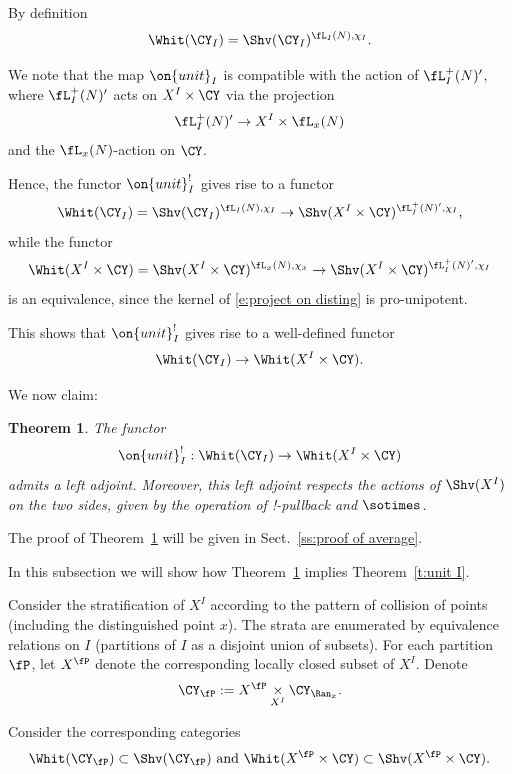 \documentclass[9pt]{amsart}
\newtheorem{thm}[subsubsection]{Theorem}
\theoremstyle{definition}
\theoremstyle{remark}
\newcommand{\thmref}[1]{Theorem~\ref{#1}}
\newcommand{\secref}[1]{Sect.~\ref{#1}}
\numberwithin{equation}{section}
\begin{document}
By definition
$$\Whit(\CY_I)=\Shv(\CY_I)^{\fL_I(N),\chi_I}.$$

We note that the map $\on{unit}_I$ is compatible with the action of $\fL^+_I(N)'$, where $\fL^+_I(N)'$ acts on $X^I\times \CY$
via the projection 
\begin{equation} \label{e:project on disting}
\fL^+_I(N)'\to X^I\times \fL_x(N)
\end{equation} 
and the $\fL_x(N)$-action on $\CY$.

\medskip

Hence, the functor $\on{unit}_I^!$ gives rise to a functor
$$\Whit(\CY_I)=\Shv(\CY_I)^{\fL_I(N),\chi_I}\to \Shv(X^I\times \CY)^{\fL^+_I(N)',\chi_I},$$
while the functor
$$\Whit(X^I\times \CY)=\Shv(X^I\times \CY)^{\fL_x(N),\chi_x}\to \Shv(X^I\times \CY)^{\fL^+_I(N)',\chi_I}$$
is an equivalence, since the kernel of \eqref{e:project on disting} is pro-unipotent. 

\medskip

This shows that $\on{unit}_I^!$ gives rise to a well-defined functor
$$\Whit(\CY_I)\to \Whit(X^I\times \CY).$$

\sssec{}

We now claim:

\begin{thm} \label{t:averaging}
The functor 
$$\on{unit}_I^!:\Whit(\CY_I)\to \Whit(X^I\times \CY)$$
admits a left adjoint.  
Moreover, this left adjoint respects the actions of $\Shv(X^I)$ on the two sides, given by
the operation of !-pullback and $\sotimes$. 
\end{thm}

The proof of \thmref{t:averaging} will be given in \secref{ss:proof of average}. 

\ssec{Proof of \thmref{t:unit I}}  

In this subsection we will show how \thmref{t:averaging} implies \thmref{t:unit I}. 

\sssec{}

Consider the stratification of $X^I$ according to the pattern of collision of points (including the distinguished point $x$). 
The strata are enumerated by equivalence relations on $I$ (partitions of $I$ as a disjoint union of subsets). 
For each partition $\fP$, let $X^\fP$ denote the corresponding locally closed subset of $X^I$. Denote
$$\CY_\fP:=X^\fP\underset{X^I}\times \CY_{\Ran_x} .$$

Consider the corresponding categories
$$\Whit(\CY_\fP)\subset \Shv(\CY_\fP) \text{ and } \Whit(X^\fP\times \CY)\subset \Shv(X^\fP\times \CY).$$
\end{document}
